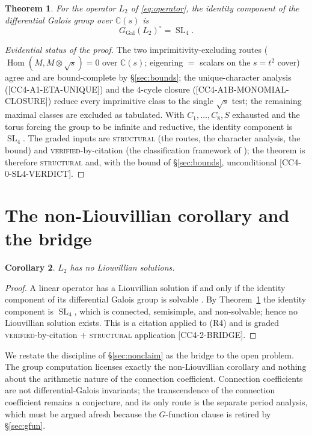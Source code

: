\documentclass[11pt,reqno]{amsart}
\theoremstyle{plain}
\newtheorem{theorem}{Theorem}
\newtheorem{corollary}[theorem]{Corollary}
\theoremstyle{definition}
\theoremstyle{remark}
\newcommand{\C}{\mathbb{C}}
\newcommand{\GGal}{G_{\mathrm{Gal}}}
\newcommand{\SL}{\operatorname{SL}}
\newcommand{\Hom}{\operatorname{Hom}}
\newcommand{\Ltwo}{L_{2}}
\newcommand{\claim}[1]{\textsf{\small[#1]}}
\begin{document}
\begin{theorem}\label{thm:main}
For the operator $\Ltwo$ of \eqref{eq:operator}, the identity component of the
differential Galois group over $\C(s)$ is
\[
  \GGal(\Ltwo)^{\circ}=\SL_{4}.
\]
\end{theorem}

\begin{proof}[Evidential status of the proof]
The two imprimitivity-excluding routes ($\Hom(M,M\otimes\sqrt{s})=0$ over
$\C(s)$; eigenring $=$ scalars on the $s=t^{2}$ cover) agree and are
bound-complete by \S\ref{sec:bounds}; the unique-character analysis
(\claim{CC4-A1-ETA-UNIQUE}) and the $4$-cycle closure
(\claim{CC4-A1B-MONOMIAL-CLOSURE}) reduce every imprimitive class to the single
$\sqrt{s}$ test; the remaining maximal classes are excluded as tabulated. With
$C_{1},\dots,C_{8},S$ exhausted and the torus forcing the group to be infinite
and reductive, the identity component is $\SL_{4}$. The graded inputs are
\textsc{structural} (the routes, the character analysis, the bound) and
\textsc{verified}-by-citation (the classification framework of
\cite{vdPutSinger}); the theorem is therefore \textsc{structural} and, with the
bound of \S\ref{sec:bounds}, unconditional \claim{CC4-0-SL4-VERDICT}.
\end{proof}

\section{The non-Liouvillian corollary and the bridge}\label{sec:bridge}

\begin{corollary}\label{cor:liouville}
$\Ltwo$ has no Liouvillian solutions.
\end{corollary}

\begin{proof}
A linear operator has a Liouvillian solution if and only if the identity
component of its differential Galois group is solvable
\cite[Ch.~1,4]{vdPutSinger}. By Theorem~\ref{thm:main} the identity component
is $\SL_{4}$, which is connected, semisimple, and non-solvable; hence no
Liouvillian solution exists. This is a citation applied to (R4) and is graded
\textsc{verified}-by-citation $+$ \textsc{structural} application
\claim{CC4-2-BRIDGE}.
\end{proof}

We restate the discipline of \S\ref{sec:nonclaim} as the bridge to the open
problem. The group computation licenses exactly the non-Liouvillian corollary
and nothing about the arithmetic nature of the connection coefficient.
Connection coefficients are not differential-Galois invariants; the
transcendence of the connection coefficient remains a conjecture, and its only
route is the separate period analysis, which must be argued afresh because the
$G$-function clause is retired by \S\ref{sec:gfun}.
\end{document}
